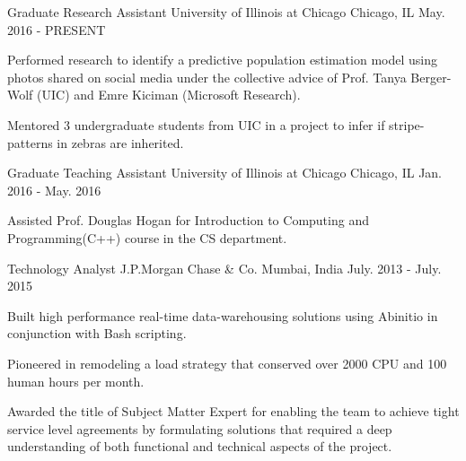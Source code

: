 \begin{cventries}
    \cventry
        {Graduate Research Assistant}
        {University of Illinois at Chicago}
        {Chicago, IL}
        {May. 2016 - PRESENT}
        {
            \begin{cvitems}
                \item{Performed research to identify a predictive population estimation model using photos shared on social media under the collective advice of Prof. Tanya Berger-Wolf (UIC) and Emre Kiciman (Microsoft Research).}
                \item{ Mentored 3 undergraduate students from UIC in a project to infer if stripe-patterns in zebras are inherited.}
            \end{cvitems}
        }
    \cventry
        {Graduate Teaching Assistant}
        {University of Illinois at Chicago}
        {Chicago, IL}
        {Jan. 2016 - May. 2016}
        {
            \begin{cvitems}
                \item{Assisted Prof. Douglas Hogan for Introduction to Computing and Programming(C++) course in the CS department.}
            \end{cvitems}
        }
        
    \cventry
        {Technology Analyst}
        {J.P.Morgan Chase \& Co.}
        {Mumbai, India}
        {July. 2013 - July. 2015}
        {
            \begin{cvitems}
                \item {Built high performance real-time data-warehousing solutions using Abinitio in conjunction with Bash scripting.}
                \item{Pioneered in remodeling a load strategy that conserved over 2000 CPU and 100 human hours per month.}
                \item{Awarded the title of Subject Matter Expert for enabling the team to achieve tight service level agreements by formulating solutions that required a deep understanding of both functional and technical aspects of the project.}
            \end{cvitems}
        }
\end{cventries}
